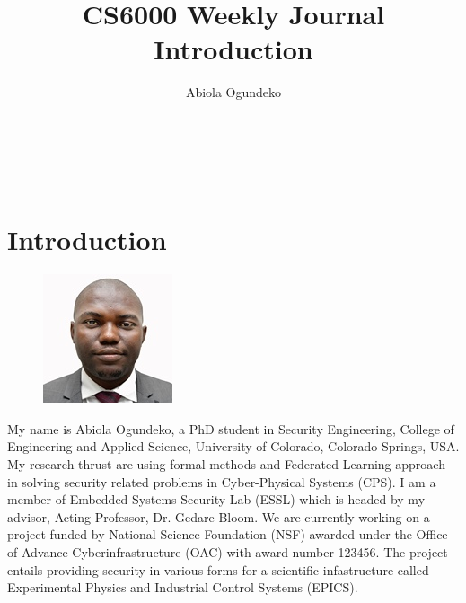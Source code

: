 



\title{CS6000 Weekly Journal Introduction}

\author{\alignauthor
Abiola Ogundeko\\
       \\
       \\
	\\
	\\
	}

\maketitle


\section{Introduction}
\begin{figure}
\centering
{\includegraphics[scale=0.9]{ogundeko.JPG}}
\end{figure}

My name is Abiola Ogundeko, a PhD student in Security Engineering, College of Engineering and Applied Science, University of Colorado, Colorado Springs, USA. My research thrust are using formal methods and Federated Learning approach in solving security related problems in Cyber-Physical Systems (CPS). I am a member of Embedded Systems Security Lab (ESSL) which is headed by my advisor, Acting Professor, Dr. Gedare Bloom. We are currently working on a project funded by National Science Foundation (NSF) awarded under the Office of Advance Cyberinfrastructure (OAC) with award number 123456. The project entails providing security in various forms for a scientific infastructure called Experimental Physics and Industrial Control Systems (EPICS). 
